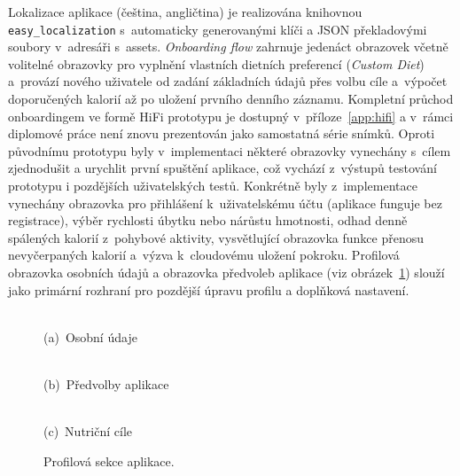 Lokalizace aplikace (čeština, angličtina) je realizována knihovnou \texttt{easy\_\hspace{0pt}localization} s~automaticky generovanými klíči a JSON překladovými soubory v~adresáři s~assets.
\emph{Onboarding flow} zahrnuje jedenáct obrazovek včetně volitelné obrazovky pro vyplnění vlastních dietních preferencí (\emph{Custom Diet}) a~provází nového uživatele od zadání základních údajů přes volbu cíle a~výpočet doporučených kalorií až po uložení prvního denního záznamu.
Kompletní průchod onboardingem ve formě HiFi prototypu je dostupný v~příloze~\ref{app:hifi} a v~rámci diplomové práce není znovu prezentován jako samostatná série snímků.
Oproti původnímu prototypu byly v~implementaci některé obrazovky vynechány s~cílem zjednodušit a urychlit první spuštění aplikace, což vychází z~výstupů testování prototypu i pozdějších uživatelských testů.
Konkrétně byly z~implementace vynechány obrazovka pro přihlášení k~uživatelskému účtu (aplikace funguje bez registrace), výběr rychlosti úbytku nebo nárůstu hmotnosti, odhad denně spálených kalorií z~pohybové aktivity, vysvětlující obrazovka funkce přenosu nevyčerpaných kalorií a~výzva k~cloudovému uložení pokroku.
Profilová obrazovka osobních údajů a obrazovka předvoleb aplikace (viz obrázek~\ref{fig:screenPersonalDetailsAndPrefs}) slouží jako primární rozhraní pro pozdější úpravu profilu a doplňková nastavení.

\begin{figure}[!htb]
	\centering
	\begin{minipage}[t]{0.31\textwidth}
		\centering
		\\(a)~Osobní údaje
	\end{minipage}\hfill
	\begin{minipage}[t]{0.31\textwidth}
		\centering
		\\(b)~Předvolby aplikace
	\end{minipage}\hfill
	\begin{minipage}[t]{0.31\textwidth}
		\centering
		\\(c)~Nutriční cíle
	\end{minipage}
	\caption{Profilová sekce aplikace.}
	\label{fig:screenPersonalDetailsAndPrefs}
\end{figure}

